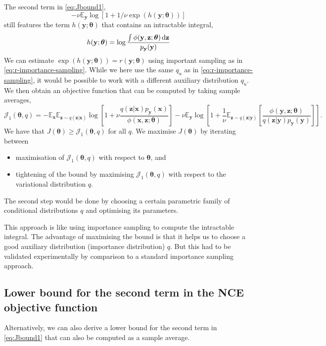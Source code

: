 \documentclass[11pt, oneside]{article}
\newcommand{\thetab}{{\boldsymbol{\theta}}}
\newcommand{\pnn}{\phi}
\newcommand{\pnoise}{p_{ \mathbf y}}
\newcommand{\x}{{\mathbf x}}
\newcommand{\y}{{\mathbf y}}
\newcommand{\z}{{\mathbf z}}
\newcommand{\E}{\mathbb{E}}
\newcommand{\Ex}{\E_{\x}}
\newcommand{\Ey}{\E_{\y}}
\newcommand{\J}{\mathcal{J}}
\begin{document}
The second term in \eqref{eq:Jbound1},
\[-\nu \Ey \log \left[1+1/\nu \exp(h(\y;\thetab))\right] \]
still features the term $h(\y;\thetab)$ that contains an intractable integral,
\begin{equation}
  h(\y;\thetab) = \log \frac{\int \phi(\y,\z;\thetab) \dif \z}{\pnoise(\y)}
\end{equation}
We can estimate $\exp(h(\y; \thetab)) = r(\y; \thetab)$ using
important sampling as in \eqref{eq:r-importance-sampling}. While we
here use the same $q_u$ as in \eqref{eq:r-importance-sampling}, it
would be possible to work with a different auxiliary distribution $q_u$. We
then obtain an objective function that can be computed by taking
sample averages,
\begin{equation}
  \J_1(\thetab, q) = -\Ex \E_{\z \sim q(\z|\x)} \log \left[1+\nu \frac{q(\z|\x)\pnoise(\x)}{\pnn(\x,\z; \thetab)}\right] -  \nu \Ey \log \left[1+\frac{1}{\nu} \E_{\z \sim q(\z | \y)} \left[\frac{\pnn(\y,\z; \thetab)} {q(\z | \y)\pnoise(\y)} \right]  \right].
  \label{eq:obj1}
\end{equation}
We have that $J(\thetab) \ge \J_1(\thetab, q)$ for all $q$. We maximise $J(\thetab)$ by iterating between
\begin{itemize}
  \item maximisation of $\J_1(\thetab,q)$ with respect to $\thetab$, and
  \item tightening of the bound by maximising $\J_1(\thetab,q)$ with respect to the variational distribution $q$.
\end{itemize}
The second step would be done by choosing a certain parametric family of conditional distributions $q$ and optimising its parameters.

This approach is like using importance sampling to compute the
intractable integral. The advantage of maximising the bound is that it
helps us to choose a good auxiliary distribution (importance
distribution) $q$. But this had to be validated experimentally by
comparison to a standard importance sampling approach.

\subsection{Lower bound for the second term in the NCE objective function}
Alternatively, we can also derive a lower bound for the second term in
\eqref{eq:Jbound1} that can also be computed as a sample average.
\end{document}
